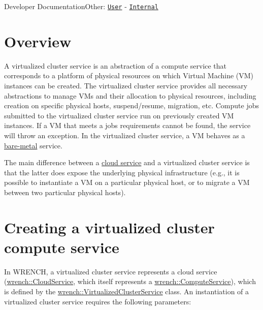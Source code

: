 Developer DocumentationOther\+: \href{../user/guide-virtualizedcluster.html}{\tt User} -\/ \href{../internal/guide-virtualizedcluster.html}{\tt Internal}\hypertarget{guide-virtualizedcluster_guide-virtualizedcluster-overview}{}\section{Overview}\label{guide-virtualizedcluster_guide-virtualizedcluster-overview}
A virtualized cluster service is an abstraction of a compute service that corresponds to a platform of physical resources on which Virtual Machine (VM) instances can be created. The virtualized cluster service provides all necessary abstractions to manage V\+Ms and their allocation to physical resources, including creation on specific physical hosts, suspend/resume, migration, etc. Compute jobs submitted to the virtualized cluster service run on previously created VM instances. If a VM that meets a job\textquotesingle{}s requirements cannot be found, the service will throw an exception. In the virtualized cluster service, a VM behaves as a \hyperlink{guide-baremetal}{bare-\/metal} service.

The main difference between a \hyperlink{guide-cloud}{cloud service} and a virtualized cluster service is that the latter does expose the underlying physical infrastructure (e.\+g., it is possible to instantiate a VM on a particular physical host, or to migrate a VM between two particular physical hosts).\hypertarget{guide-virtualizedcluster_guide-virtualizedcluster-creating}{}\section{Creating a virtualized cluster compute service}\label{guide-virtualizedcluster_guide-virtualizedcluster-creating}
In W\+R\+E\+N\+CH, a virtualized cluster service represents a cloud service (\hyperlink{classwrench_1_1_cloud_service}{wrench\+::\+Cloud\+Service}, which itself represents a \hyperlink{classwrench_1_1_compute_service}{wrench\+::\+Compute\+Service}), which is defined by the \hyperlink{classwrench_1_1_virtualized_cluster_service}{wrench\+::\+Virtualized\+Cluster\+Service} class. An instantiation of a virtualized cluster service requires the following parameters\+:


